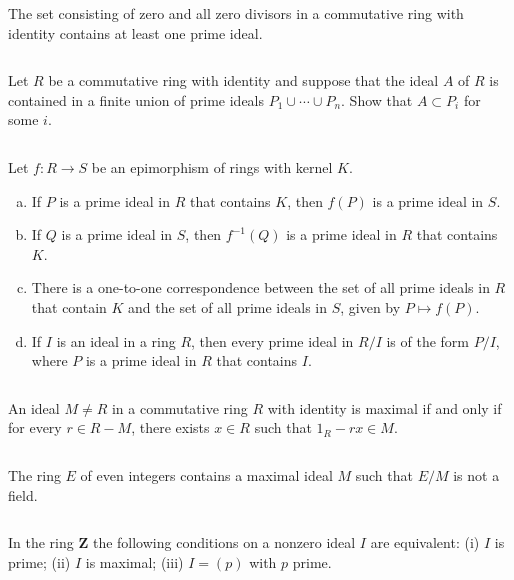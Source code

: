 \begin{ex}
    The set consisting of zero and all zero divisors in a commutative ring with identity contains at least one prime ideal.
\end{ex}

$$ $$

\begin{ex}
    Let $R$ be a commutative ring with identity and suppose that the ideal $A$ of $R$ is contained in a finite union of prime ideals $P_{1}\cup\cdots\cup P_{n}$. Show that $A\subset P_{i}$ for some $i$.
\end{ex}

$$ $$

\begin{ex}
    Let $f:R\to S$ be an epimorphism of rings with kernel $K$.
    \begin{enumerate}[(a)]
        \item If $P$ is a prime ideal in $R$ that contains $K$, then $f(P)$ is a prime ideal in $S$.
        \item If $Q$ is a prime ideal in $S$, then $f^{-1}(Q)$ is a prime ideal in $R$ that contains $K$.
        \item There is a one-to-one correspondence between the set of all prime ideals in $R$ that contain $K$ and the set of all prime ideals in $S$, given by $P\mapsto f(P)$.
        \item If $I$ is an ideal in a ring $R$, then every prime ideal in $R /I$ is of the form $P /I$, where $P$ is a prime ideal in $R$ that contains $I$.
    \end{enumerate}
\end{ex}

$$ $$

\begin{ex}
    An ideal $M\neq R$ in a commutative ring $R$ with identity is maximal if and only if for every $r\in R-M$, there exists $x\in R$ such that $1_{R}-rx\in M$.
\end{ex}

$$ $$

\begin{ex}
    The ring $E$ of even integers contains a maximal ideal $M$ such that $E /M$ is not a field.
\end{ex}

$$ $$

\begin{ex}
    In the ring $\mathbf{Z}$ the following conditions on a nonzero ideal $I$ are equivalent: (i) $I$ is prime; (ii) $I$ is maximal; (iii) $I=(p)$ with $p$ prime.    
\end{ex}

